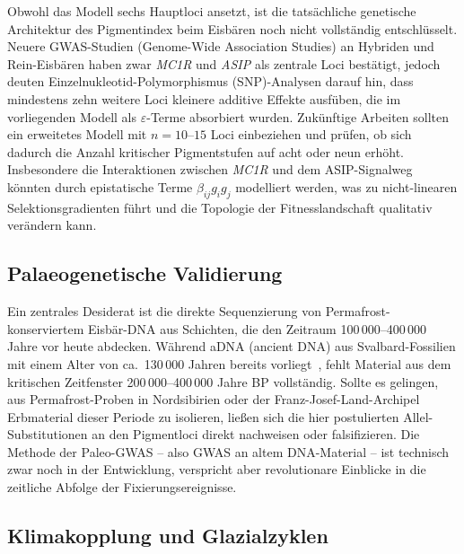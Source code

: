 ﻿\documentclass[12pt,a4paper]{article}
\theoremstyle{remark}
\begin{document}
Obwohl das Modell sechs Hauptloci ansetzt, ist die tats\"{a}chliche genetische
Architektur des Pigmentindex beim Eisb\"{a}ren noch nicht vollst\"{a}ndig
entschl\"{u}sselt. Neuere GWAS-Studien (Genome-Wide Association Studies) an
Hybriden und Rein-Eisb\"{a}ren haben zwar \textit{MC1R} und \textit{ASIP} als
zentrale Loci best\"{a}tigt, jedoch deuten Einzelnukleotid-Polymorphismus
(SNP)-Analysen darauf hin, dass mindestens zehn weitere Loci kleinere additive
Effekte ausf\"{u}ben, die im vorliegenden Modell als $\varepsilon$-Terme
absorbiert wurden. Zuk\"{u}nftige Arbeiten sollten ein erweitetes Modell mit
$n = 10$--$15$ Loci einbeziehen und pr\"{u}fen, ob sich dadurch die Anzahl
kritischer Pigmentstufen auf acht oder neun erh\"{o}ht. Insbesondere die
Interaktionen zwischen \textit{MC1R} und dem ASIP-Signalweg k\"{o}nnten
durch epistatische Terme $\beta_{ij} g_i g_j$ modelliert werden,
was zu nicht-linearen Selektionsgradienten f\"{u}hrt und die Topologie
der Fitnesslandschaft qualitativ ver\"{a}ndern kann.

\subsection{Palaeogenetische Validierung}

Ein zentrales Desiderat ist die direkte Sequenzierung von Permafrost-konserviertem
Eisb\"{a}r-DNA aus Schichten, die den Zeitraum 100\,000--400\,000 Jahre vor
heute abdecken. W\"{a}hrend aDNA (ancient DNA) aus Svalbard-Fossilien mit
einem Alter von ca.~130\,000 Jahren bereits vorliegt~\cite{lindqvist2010},
fehlt Material aus dem kritischen Zeitfenster 200\,000--400\,000 Jahre BP
vollst\"{a}ndig. Sollte es gelingen, aus Permafrost-Proben in Nordsibirien
oder der Franz-Josef-Land-Archipel Erbmaterial dieser Periode zu isolieren,
lie\ss{}en sich die hier postulierten Allel-Substitutionen an den
Pigmentloci direkt nachweisen oder falsifizieren. Die Methode der
Paleo-GWAS -- also GWAS an altem DNA-Material -- ist technisch
zwar noch in der Entwicklung, verspricht aber revolutionare Einblicke
in die zeitliche Abfolge der Fixierungsereignisse.

\subsection{Klimakopplung und Glazialzyklen}
\end{document}
